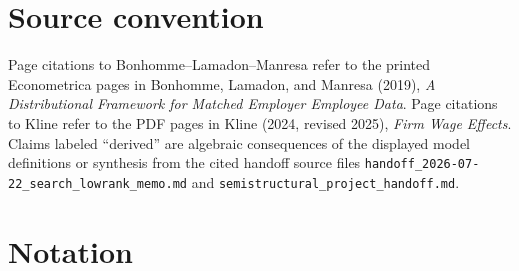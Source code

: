 \documentclass[11pt]{article}
\begin{document}
\section{Source convention}

Page citations to Bonhomme--Lamadon--Manresa refer to the printed Econometrica
pages in Bonhomme, Lamadon, and Manresa (2019), \emph{A Distributional
Framework for Matched Employer Employee Data}. Page citations to Kline refer to
the PDF pages in Kline (2024, revised 2025), \emph{Firm Wage Effects}. Claims
labeled ``derived'' are algebraic consequences of the displayed model
definitions or synthesis from the cited handoff source files
\texttt{handoff\_2026-07-22\_search\_lowrank\_memo.md} and
\texttt{semistructural\_project\_handoff.md}.

\section{Notation}
\end{document}
